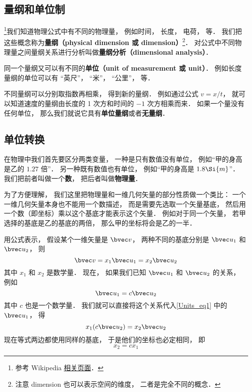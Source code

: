 
\subsection{量纲和单位制}
\footnote{参考 Wikipedia \href{https://en.wikipedia.org/wiki/Dimensional_analysis}{相关页面}．}我们知道物理公式中有不同的物理量， 例如时间， 长度， 电荷， 等． 我们把这些概念称为\textbf{量纲（physical dimension 或 dimension）}\footnote{注意 dimension 也可以表示空间的维度， 二者是完全不同的概念．}． 对公式中不同物理量之间量纲关系进行分析叫做\textbf{量纲分析（dimensional analysis）}．

同一个量纲又可以有不同的\textbf{单位（unit of measurement 或 unit）}． 例如长度量纲的单位可以有 “英尺”， “米”， “公里”， 等．

不同量纲可以分别取指数再相乘， 得到新的量纲． 例如通过公式 $v = x/t$， 就可以知道速度的量纲由长度的 1 次方和时间的 $-1$ 次方相乘而来． 如果一个量没有任何单位， 那么我们就说它具有\textbf{单位量纲}或者\textbf{无量纲}．

\subsection{单位转换}


在物理中我们首先要区分两类变量， 一种是只有数值没有单位， 例如“甲的身高是乙的 $1.27$ 倍”． 另一种既有数值也有单位， 例如“甲的身高是 $1.8\Si{m}$”． 我们把前者叫做一个\textbf{数}， 把后者叫做\textbf{物理量}．

为了方便理解， 我们这里把物理量和一维几何矢量的部分性质做一个类比： 一个一维几何矢量本身也不能用一个数描述， 而是需要先选取一个矢量基底， 然后用一个数（即坐标）乘以这个基底才能表示这个矢量． 例如对于同一个矢量， 若甲选择的基底是乙的基底的两倍， 那么甲的坐标将会是乙的一半．

用公式表示， 假设某个一维矢量是 $\bvec v$， 两种不同的基底分别是 $\bvec u_1$ 和 $\bvec u_2$， 则
\begin{equation}\label{Units_eq1}
\bvec v = x_1 \bvec u_1 = x_2 \bvec u_2
\end{equation}
其中 $x_1$ 和 $x_2$ 是数学量． 现在， 如果我们已知 $\bvec u_1$ 和 $\bvec u_2$ 的关系， 例如
\begin{equation}\label{Units_eq2}
\bvec u_1 = c \bvec u_2
\end{equation}
其中 $c$ 也是一个数学量． 我们就可以直接将这个关系代入\autoref{Units_eq1} 中的 $\bvec u_1$， 得
\begin{equation}
x_1 (c \bvec u_2) = x_2 \bvec u_2
\end{equation}
现在等式两边都使用同样的基底， 于是他们的坐标也必定相同， 即
\begin{equation}
x_2 = c x_1
\end{equation}

